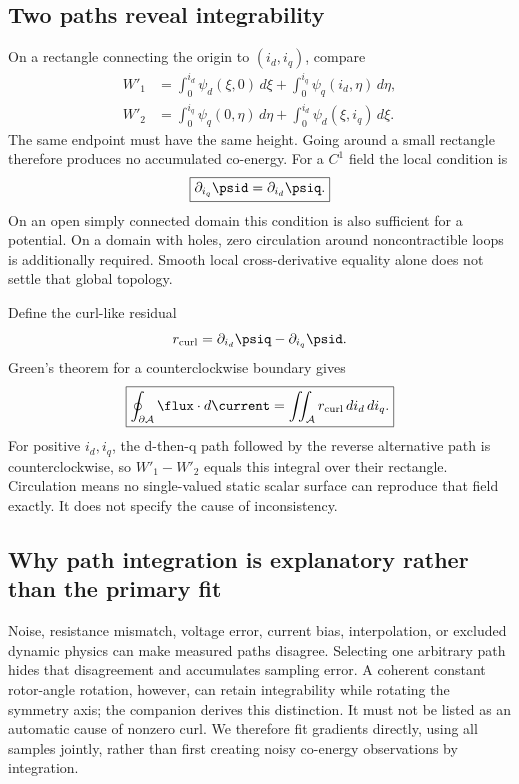 \subsection{Two paths reveal integrability}
On a rectangle connecting the origin to $(i_d,i_q)$, compare
\begin{align}
 W'_1&=\int_0^{i_d}\psi_d(\xi,0)\,d\xi
        +\int_0^{i_q}\psi_q(i_d,\eta)\,d\eta,\\
 W'_2&=\int_0^{i_q}\psi_q(0,\eta)\,d\eta
        +\int_0^{i_d}\psi_d(\xi,i_q)\,d\xi.
\end{align}
The same endpoint must have the same height. Going around a small rectangle
therefore produces no accumulated co-energy. For a $C^1$ field the local
condition is
\begin{equation}
 \boxed{\partial_{i_q}\psid=\partial_{i_d}\psiq.}\label{eq:integrability}
\end{equation}
On an open simply connected domain this condition is also sufficient for a
potential. On a domain with holes, zero circulation around noncontractible
loops is additionally required. Smooth local cross-derivative equality alone
does not settle that global topology.

Define the curl-like residual
\begin{equation}
 r_{\rm curl}=\partial_{i_d}\psiq-\partial_{i_q}\psid.
\end{equation}
Green's theorem for a counterclockwise boundary gives
\begin{equation}
 \boxed{\oint_{\partial\mathcal A}\flux\cdot d\current
        =\iint_{\mathcal A}r_{\rm curl}\,di_d\,di_q.}
 \label{eq:green}
\end{equation}
For positive $i_d,i_q$, the d-then-q path followed by the reverse alternative
path is counterclockwise, so $W'_1-W'_2$ equals this integral over their
rectangle. Circulation means no single-valued static scalar surface can
reproduce that field exactly. It does not specify the cause of inconsistency.


\subsection{Why path integration is explanatory rather than the primary fit}
Noise, resistance mismatch, voltage error, current bias, interpolation, or
excluded dynamic physics can make measured paths disagree. Selecting one
arbitrary path hides that disagreement and accumulates sampling error.
A coherent constant rotor-angle rotation, however, can retain integrability
while rotating the symmetry axis; the companion derives this distinction.
It must not be listed as an automatic cause of nonzero curl.
We therefore fit gradients directly, using all samples jointly, rather than
first creating noisy co-energy observations by integration.

